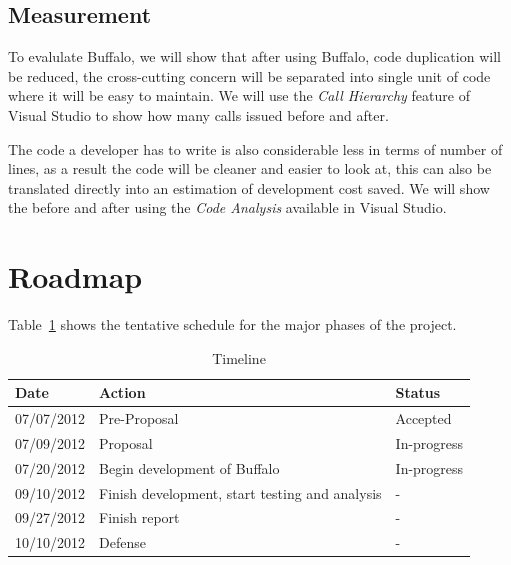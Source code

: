\subsection{Measurement}
To evalulate Buffalo, we will show that after using Buffalo, code duplication will be reduced, the cross-cutting concern will be separated into single unit of code where it will be easy to maintain. We will use the {\em Call Hierarchy} feature of Visual Studio to show how many calls issued before and after. 

The code a developer has to write is also considerable less in terms of number of lines, as a result the code will be cleaner and easier to look at, this can also be translated directly into an estimation of development cost saved. We will show the before and after using the {\em Code Analysis} available in Visual Studio.

\section{Roadmap}
Table~\ref{tab:roadmap_tbl} shows the tentative schedule for the major phases of the project.

\begin{table}[H]
\centering
\begin{tabular}{|l|l|l|}
\hline
Date & Action & Status\\
\hline
07/07/2012 & Pre-Proposal & Accepted\\
07/09/2012 & Proposal & In-progress\\
07/20/2012 & Begin development of Buffalo & In-progress\\
09/10/2012 & Finish development, start testing and analysis & - \\
09/27/2012 & Finish report & - \\
10/10/2012 & Defense & - \\
\hline
\end{tabular}
\caption{Timeline}
\label{tab:roadmap_tbl}
\end{table}



\singlespacing




